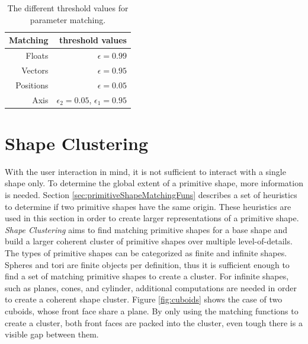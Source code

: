 \begin{table}
\centering
\begin{tabular}{ r | r }
    Matching    & threshold values \\
    \hline
  Floats         & $\epsilon = 0.99$ \\
    Vectors     & $\epsilon = 0.95$ \\
  Positions & $\epsilon = 0.05$ \\ 
    Axis             & $\epsilon_2 = 0.05$, $\epsilon_1 = 0.95$ \\  

\end{tabular}
\caption{The different threshold values for parameter matching.}
\label{tab:matchingThresholds}
\end{table}


\section{Shape Clustering}
\label{sec:ShapeClustering}

With the user interaction in mind, it is not sufficient to interact with a single shape only. To determine the global extent of a primitive shape, more information is needed. Section \ref{sec:primitiveShapeMatchingFuns} describes a set of heuristics to determine if two primitive shapes have the same origin. These heuristics are used in this section in order to create larger representations of a primitive shape. 
\textit{Shape Clustering} aims to find matching primitive shapes for a base shape and build a larger coherent cluster of primitive shapes over multiple level-of-details. The types of primitive shapes can be categorized as finite and infinite shapes. Spheres and tori are finite objects per definition, thus it is sufficient enough to find a set of matching primitive shapes to create a cluster. For infinite shapes, such as planes, cones, and cylinder, additional computations are needed in order to create a coherent shape cluster. Figure \ref{fig:cuboids} shows the case of two cuboids, whose front face share a plane. By only using the matching functions to create a cluster, both front faces are packed into the cluster, even tough there is a visible gap between them.

